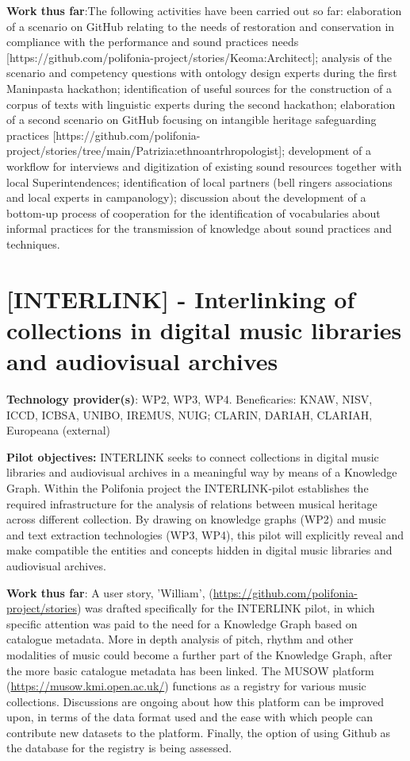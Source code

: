 \textbf{Work thus far}:The following activities have been carried out so far: elaboration of a scenario on GitHub relating to the needs of restoration and conservation in compliance with the performance and sound practices needs [https://github.com/polifonia-project/stories/Keoma:Architect]; analysis of the scenario and competency questions with ontology design experts during the first Maninpasta hackathon; identification of useful sources for the construction of a corpus of texts with linguistic experts during the second hackathon; elaboration of a second scenario on GitHub focusing on intangible heritage safeguarding practices [https://github.com/polifonia-project/stories/tree/main/Patrizia:ethnoantrhropologist]; development of a workflow for interviews and digitization of existing sound resources together with local Superintendences; identification of local partners (bell ringers associations and local experts in campanology); discussion about the  development of a bottom-up process of cooperation for the identification of vocabularies about  informal practices for the transmission of knowledge about sound practices and techniques.

\section{[INTERLINK] - Interlinking of collections in digital music libraries and audiovisual archives}\label{sec:pilot:interlink}

\textbf{Technology provider(s)}: WP2, WP3, WP4. 
Beneficaries: KNAW, NISV, ICCD, ICBSA, UNIBO, 
IREMUS, NUIG; CLARIN, DARIAH, CLARIAH, Europeana (external)

\textbf{Pilot objectives:} INTERLINK seeks to connect collections in digital music libraries and audiovisual archives in a meaningful way by means of a Knowledge Graph. Within the Polifonia project the INTERLINK-pilot establishes the required infrastructure for the analysis of relations between musical heritage across different collection. By drawing on knowledge graphs (WP2) and music and text extraction technologies (WP3, WP4), this pilot will explicitly reveal and make compatible the entities and concepts hidden in digital music libraries and audiovisual archives.

\textbf{Work thus far}: 
A user story, 'William', (\url {https://github.com/polifonia-project/stories}) was drafted specifically for the INTERLINK pilot, in which specific attention was paid to the need for a Knowledge Graph based on catalogue metadata. More in depth analysis of pitch, rhythm and other modalities of music could become a further part of the Knowledge Graph, after the more basic catalogue metadata has been linked. 
The MUSOW platform (\url {https://musow.kmi.open.ac.uk/}) functions as a registry for various music collections. Discussions are ongoing about how this platform can be improved upon, in terms of the data format used and the ease with which people can contribute new datasets to the platform.
Finally, the option of using Github as the database for the registry is being assessed.

